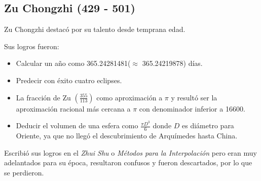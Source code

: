 \documentclass[12pt, aspectratio=169]{beamer} %
\begin{document}
	\subsection{Zu Chongzhi (429 - 501)}
		\begin{frame}
			
			\pause 
			Zu Chongzhi destacó por su talento desde temprana edad.
			
			Sus logros fueron:
			\pause
			\begin{itemize}
				\item Calcular un año como 365.24281481($\approx$ 365.24219878) días.
				\item Predecir con éxito cuatro eclipses.
				\pause
				\item La fracción de Zu $\displaystyle \left(\frac{355}{113}\right)$ como aproximación a $\pi$ y
				resultó ser la aproximación racional más cercana a $\pi$ con denominador inferior a 16600.
				\pause
				\item Deducir el volumen de una esfera como $\frac{\pi D^3}{6}$ donde $D$ es diámetro para Oriente,
				ya que no llegó el descubrimiento de Arquímedes hasta China.
			\end{itemize}
			
			\pause
			
			Escribió sus logros en el \textit{Zhui Shu} o \textit{Métodos para la Interpolación} pero eran muy
			adelantados para su época, resultaron confusos y fueron descartados, por lo que se perdieron.
		\end{frame}
\end{document}
